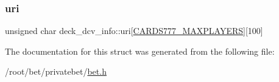 \subsubsection{\texorpdfstring{uri}{uri}}
{\footnotesize\ttfamily unsigned char deck\+\_\+dcv\+\_\+info\+::uri\mbox{[}\hyperlink{common_8h_a97d6188fd175f4ea7268e9445107a7c0}{C\+A\+R\+D\+S777\+\_\+\+M\+A\+X\+P\+L\+A\+Y\+E\+RS}\mbox{]}\mbox{[}100\mbox{]}}



The documentation for this struct was generated from the following file\+:\begin{DoxyCompactItemize}
\item 
/root/bet/privatebet/\hyperlink{bet_8h}{bet.\+h}\end{DoxyCompactItemize}
